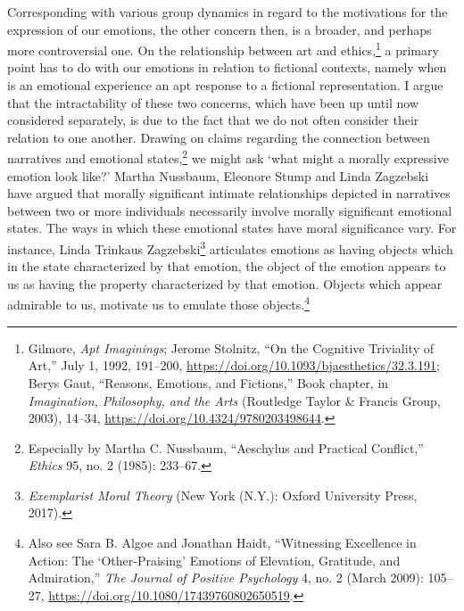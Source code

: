\documentclass[phdthesis,12pt,final]{wuthesis}
\theoremstyle{definition}
\theoremstyle{definition}
\theoremstyle{definition}
\theoremstyle{definition}
\theoremstyle{remark}
\begin{document}
Corresponding with various group dynamics in regard to the motivations for the expression of our emotions, the other concern then, is a broader, and perhaps more controversial one. On the relationship between art and ethics,\footnote{Gilmore, \emph{Apt {Imaginings}}; Jerome Stolnitz, {``On the {Cognitive Triviality} of {Art},''} July 1, 1992, 191--200, \url{https://doi.org/10.1093/bjaesthetics/32.3.191}; Berys Gaut, {``Reasons, Emotions, and Fictions,''} Book chapter, in \emph{Imagination, {Philosophy}, and the {Arts}} (Routledge Taylor \& Francis Group, 2003), 14--34, \url{https://doi.org/10.4324/9780203498644}.} a primary point has to do with our emotions in relation to fictional contexts, namely when is an emotional experience an apt response to a fictional representation. I argue that the intractability of these two concerns, which have been up until now considered separately, is due to the fact that we do not often consider their relation to one another. Drawing on claims regarding the connection between narratives and emotional states,\footnote{Especially by Martha C. Nussbaum, {``Aeschylus and Practical Conflict,''} \emph{Ethics} 95, no. 2 (1985): 233--67.} we might ask `what might a morally expressive emotion look like?' Martha Nussbaum, Eleonore Stump and Linda Zagzebski have argued that morally significant intimate relationships depicted in narratives between two or more individuals necessarily involve morally significant emotional states. The ways in which these emotional states have moral significance vary. For instance, Linda Trinkaus Zagzebski\footnote{\emph{Exemplarist {Moral Theory}} (New York (N.Y.): Oxford University Press, 2017).} articulates emotions as having objects which in the state characterized by that emotion, the object of the emotion appears to us as having the property characterized by that emotion. Objects which appear admirable to us, motivate us to emulate those objects.\footnote{Also see Sara B. Algoe and Jonathan Haidt, {``Witnessing Excellence in Action: The {`Other-Praising'} Emotions of Elevation, Gratitude, and Admiration,''} \emph{The Journal of Positive Psychology} 4, no. 2 (March 2009): 105--27, \url{https://doi.org/10.1080/17439760802650519}.}
\end{document}
